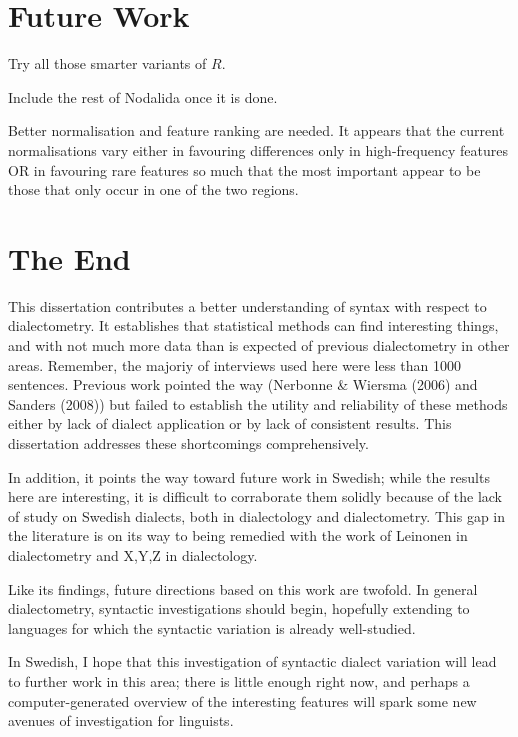 \section{Future Work}

Try all those smarter variants of $R$.

Include the rest of Nodalida once it is done.

Better normalisation and feature ranking are needed. It appears that
the current normalisations vary either in favouring differences
only in high-frequency features OR in favouring rare features so much
that the most important appear to be those that only occur in one of
the two regions.

\section{The End}

This dissertation contributes a better understanding of syntax with
respect to dialectometry. It establishes that statistical methods can
find interesting things, and with not much more data than is expected
of previous dialectometry in other areas. Remember, the majoriy of
interviews used here were less than 1000 sentences. Previous work
pointed the way (Nerbonne \& Wiersma (2006) and Sanders (2008)) but
failed to establish the utility and reliability of these methods
either by lack of dialect application or by lack of consistent
results. This dissertation addresses these shortcomings
comprehensively.

In addition, it points the way toward future work in Swedish; while
the results here are interesting, it is difficult to corraborate them
solidly because of the lack of study on Swedish dialects, both in
dialectology and dialectometry. This gap in the literature is on its
way to being remedied with the work of Leinonen in dialectometry and
X,Y,Z in dialectology.

Like its findings, future directions based on this work are
twofold. In general dialectometry, syntactic investigations should
begin, hopefully extending to languages for which the syntactic
variation is already well-studied.

In Swedish, I hope that this investigation of syntactic dialect
variation will lead to further work in this area; there is little
enough right now, and perhaps a computer-generated overview of the
interesting features will spark some new avenues of investigation for
linguists.



